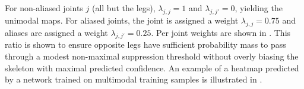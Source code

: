 For non-aliased joints $j$ (all but the legs), $\lambda_{j,j} = 1$ and $\lambda_{j,j'} = 0$, yielding the unimodal maps. For aliased joints, the joint is assigned a weight $\lambda_{j,j} = 0.75$ and aliases are assigned a weight $\lambda_{j,j'} = 0.25$. Per joint weights are shown in . This ratio is shown to ensure opposite legs have sufficient probability mass to pass through a modest non-maximal suppression threshold without overly biasing the skeleton with maximal predicted confidence. An example of a heatmap predicted by a network trained on multimodal training samples is illustrated in . 



\begin{figure}[t]
\begin{floatrow}
\end{floatrow}
\end{figure}
